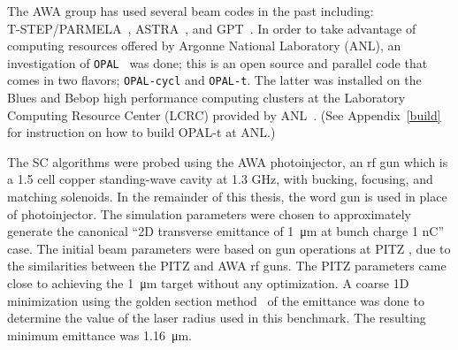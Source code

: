 The AWA group has used several beam codes in the past including:\\
\mbox{T-STEP/PARMELA}~\cite{parmela}, ASTRA~\cite{astra}, and GPT~\cite{gpt}.  
In order to take advantage of computing resources offered by 
Argonne National Laboratory (ANL), an investigation of 
\verb|OPAL|~\cite{opal} was done; this is an open source and parallel code that comes in two flavors;  
\verb|OPAL-cycl| and \verb|OPAL-t|. The latter was installed on the Blues and Bebop high performance computing clusters
at the Laboratory Computing Resource Center (LCRC) provided by ANL~\cite{lcrc}.
(See Appendix~\ref{build} for instruction on how to build OPAL-t at ANL.)

The SC algorithms were probed using the AWA photoinjector, 
an rf gun which is a 1.5 cell copper standing-wave cavity at 1.3 GHz, 
with bucking, focusing, and matching solenoids. 
In the remainder of this thesis, the word gun is used 
in place of photoinjector. The simulation parameters were chosen to 
approximately generate the canonical ``2D transverse emittance of \SI{1}{\micro\metre} at bunch charge 1 nC'' case.  
The initial beam parameters were based on gun operations at PITZ \cite{pitz},
due to the similarities between the PITZ and AWA rf guns.
The PITZ parameters came close to achieving the \SI{1}{\micro\metre}
target without any optimization. A coarse 1D minimization
using the golden section method~\cite{golden} of the 
emittance was done to determine the value of the laser radius 
used in this benchmark. The resulting minimum emittance was   
\SI{1.16}{\micro\metre}. 

